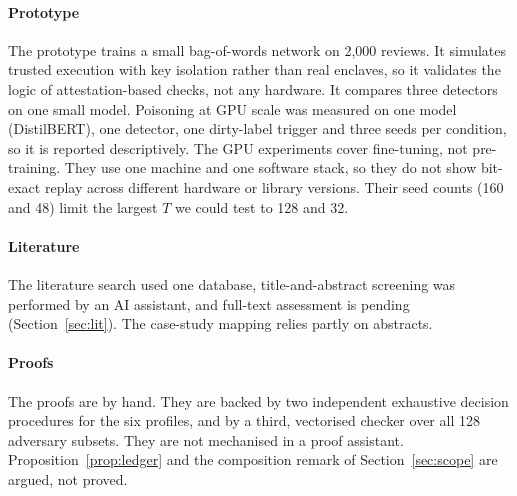 \paragraph{Prototype}
The prototype trains a small bag-of-words network on 2,000 reviews. It simulates trusted
execution with key isolation rather than real enclaves, so it validates the logic of
attestation-based checks, not any hardware. It compares three detectors on one small model. Poisoning at GPU scale was
measured on one model (DistilBERT), one detector, one dirty-label trigger and three seeds per
condition, so it is reported descriptively. The GPU
experiments cover fine-tuning, not pre-training. They use one machine and one software
stack, so they do not show bit-exact replay across different hardware or library versions.
Their seed counts (160 and 48) limit the largest $T$ we could test to 128 and 32.

\paragraph{Literature}
The literature search used one database, title-and-abstract screening was performed by an
AI assistant, and full-text assessment is pending (Section~\ref{sec:lit}). The case-study
mapping relies partly on abstracts.

\paragraph{Proofs}
The proofs are by hand. They are backed by two independent exhaustive decision procedures
for the six profiles, and by a third, vectorised checker over all 128 adversary subsets. They
are not mechanised in a proof assistant. Proposition~\ref{prop:ledger} and the composition
remark of Section~\ref{sec:scope} are argued, not proved.
